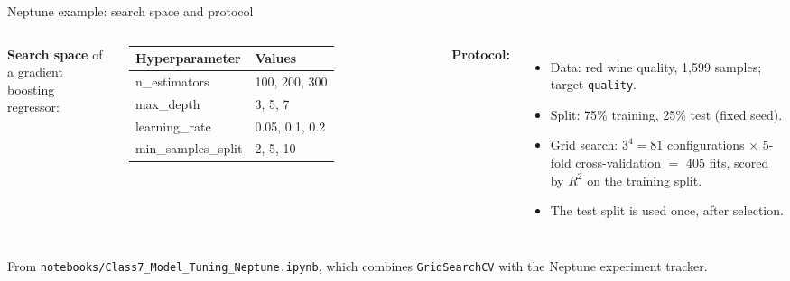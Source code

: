 \begin{frame}{Neptune example: search space and protocol}
\begin{columns}[T]
\begingroup\footnotesize
\textbf{Search space} of a gradient boosting regressor:
\vspace{0.3em}

\begin{tabular}{>{\ttfamily}l l}
\normalfont\bfseries Hyperparameter & \bfseries Values \\
\toprule
n\_estimators & 100, 200, 300 \\
max\_depth & 3, 5, 7 \\
learning\_rate & 0.05, 0.1, 0.2 \\
min\_samples\_split & 2, 5, 10 \\
\bottomrule
\end{tabular}
\par\endgroup
{}
\begingroup\footnotesize
\textbf{Protocol:}
\begin{itemize}
\item Data: red wine quality, 1{,}599 samples; target \texttt{quality}.
\item Split: 75\% training, 25\% test (fixed seed).
\item Grid search: $3^4 = 81$ configurations $\times$ 5-fold cross-validation $=$ 405 fits, scored by $R^2$ on the training split.
\item The test split is used once, after selection.
\end{itemize}
\par\endgroup
\end{columns}
\vspace{0.6em}
{\scriptsize From \texttt{notebooks/Class7\_Model\_Tuning\_Neptune.ipynb}, which combines \texttt{GridSearchCV} with the Neptune experiment tracker.\par}
\coursefooter
\end{frame}

